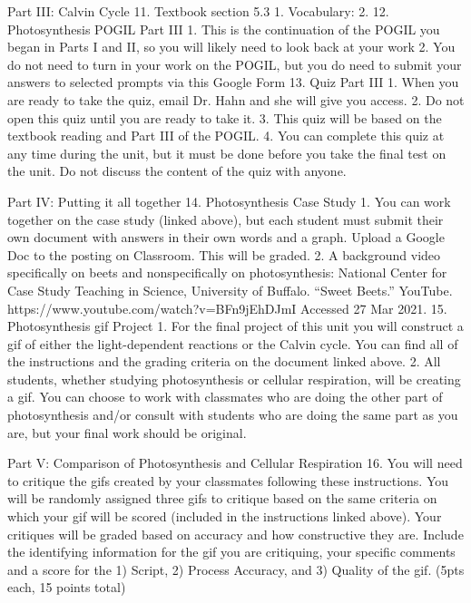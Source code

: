 Part III: Calvin Cycle
11. Textbook section 5.3
   1. Vocabulary: 
   2. 12. Photosynthesis POGIL Part III 
   1. This is the continuation of the POGIL you began in Parts I and II, so you will likely need to look back at your work 
   2. You do not need to turn in your work on the POGIL, but you do need to submit your answers to selected prompts via this Google Form
13. Quiz Part III 
   1. When you are ready to take the quiz, email Dr. Hahn and she will give you access.
   2. Do not open this quiz until you are ready to take it.
   3. This quiz will be based on the textbook reading and Part III of the POGIL. 
   4. You can complete this quiz at any time during the unit, but it must be done before you take the final test on the unit. Do not discuss the content of the quiz with anyone.


Part IV: Putting it all together
14. Photosynthesis Case Study
   1. You can work together on the case study (linked above), but each student must submit their own document with answers in their own words and a graph. Upload a Google Doc to the posting on Classroom. This will be graded.
   2. A background video specifically on beets and nonspecifically on photosynthesis: National Center for Case Study Teaching in Science, University of Buffalo. “Sweet Beets.” YouTube. https://www.youtube.com/watch?v=BFn9jEhDJmI Accessed 27 Mar 2021.
15. Photosynthesis gif Project
   1. For the final project of this unit you will construct a gif of either the light-dependent reactions or the Calvin cycle. You can find all of the instructions and the grading criteria on the document linked above.
   2. All students, whether studying photosynthesis or cellular respiration, will be creating a gif. You can choose to work with classmates who are doing the other part of photosynthesis and/or consult with students who are doing the same part as you are, but your final work should be original.


Part V: Comparison of Photosynthesis and Cellular Respiration
16. You will need to critique the gifs created by your classmates following these instructions. You will be randomly assigned three gifs to critique based on the same criteria on which your gif will be scored (included in the instructions linked above). Your critiques will be graded based on accuracy and how constructive they are. Include the identifying information for the gif you are critiquing, your specific comments and a score for the 1) Script, 2) Process Accuracy, and 3) Quality of the gif. (5pts each, 15 points total) 


